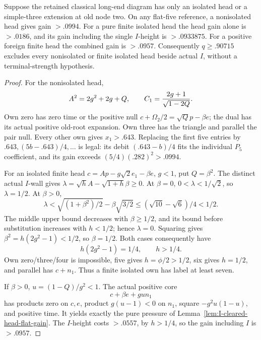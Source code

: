 \begin{lemma}
\label{lem:I-finite-head-flat-reference}
Suppose the retained classical long-end diagram has only an isolated
head or a simple-three extension at old node two. On any flat-five
reference, a nonisolated head gives gain \(>.0994\).
For a pure finite isolated head the head gain alone is \(>.0186\),
and its gain including the single \(I\)-height is \(>.0933875\).
For a positive foreign finite head the combined gain is \(>.0957\).
Consequently \(q\ge.90715\) excludes every nonisolated or finite
isolated head beside actual \(I\), without a terminal-strength hypothesis.
\end{lemma}
\begin{proof}
For the nonisolated head,
\[
 A^2=2g^2+2g+Q,\qquad C_1={2g+1\over\sqrt{1-2Q}}.
\]
Own zero has zero time or the positive null
\(c+\Omega_2/2=\sqrt Qp-\beta e\);
the dual has its actual positive old-root expansion.
Own three has the triangle and parallel the pair null.
Every other own gives \(x_1>.643\). Replacing the first five entries
by \(.643,(5b-.643)/4,\ldots\) is legal: its debit
\((.643-b)/4\) fits the individual \(P_5\) coefficient, and its
gain exceeds \((5/4)(.282)^2>.0994\).

For an isolated finite head
\(c=Ap-g\sqrt2e_1-\beta e\), \(g<1\), put \(Q=\beta^2\).
The distinct actual \(I\)-wall gives
\(\lambda=\sqrt h A-\sqrt{1+h}\beta\ge0\).
At \(\beta=0\), \(0<\lambda<1/\sqrt2\), so \(\lambda=1/2\).
At \(\beta>0\),
\[
 \lambda<\sqrt{(1+\beta^2)/2}-\beta\sqrt{3/2}
 \le(\sqrt{10}-\sqrt6)/4<1/2.
\]
The middle upper bound decreases with \(\beta\ge1/2\), and its
bound before substitution increases with \(h<1/2\); hence \(\lambda=0\).
Squaring gives \(\beta^2=h(2g^2-1)<1/2\), so \(\beta=1/2\).
Both cases consequently have
\[
 h(2g^2-1)=1/4,\qquad h>1/4.
\]
Own zero/three/four is impossible, five gives \(h=\phi/2>1/2\),
six gives \(h=1/2\), and parallel has \(c+n_1\).
Thus a finite isolated own has label at least seven.

If \(\beta>0\), \(u=(1-Q)/g^2<1\). The actual positive core
\[
 c+\beta e+gu n_1
\]
has products zero on \(c,e\), product \(g(u-1)<0\) on \(n_1\),
square \(-g^2u(1-u)\), and positive time. It yields exactly the
pure pressure of Lemma~\ref{lem:I-cleared-head-flat-gain}.
The \(I\)-height costs \(>.0557\), by \(h>1/4\), so the gain
including \(I\) is \(>.0957\).


\end{proof}
